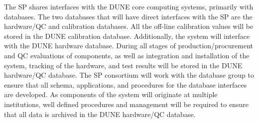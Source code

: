 The SP  shares interfaces with the DUNE core computing systems, primarily with databases. The two databases that will have direct interfaces with the SP  are the hardware/QC and calibration databases. All the off-line calibration values will be stored in the DUNE calibration database. Additionally, the system will interface with the DUNE hardware database. During all stages of production/procurement and QC evaluations of  components, as well as integration and installation of the system, tracking of the hardware, and test results will be stored in the DUNE hardware/QC database. The SP  consortium will work with the database group to ensure that all schema, applications, and procedures for the database interfaces are developed. As components of the system will originate at multiple institutions, well defined procedures and management will be required to ensure that all data is archived in the DUNE hardware/QC database. 
